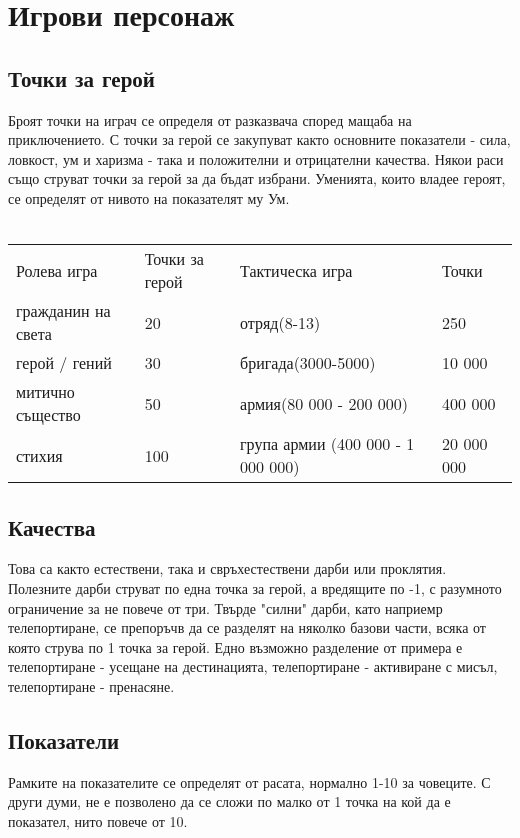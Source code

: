 
\section{Игрови персонаж}

\subsection{Точки за герой}
Броят точки на играч се определя от разказвача според мащаба на приключението.
С точки за герой се закупуват както основните показатели - сила, ловкост, ум и харизма - така и положителни и отрицателни качества.
Някои раси също струват точки за герой за да бъдат избрани.
Уменията, които владее героят, се определят от нивото на показателят му Ум.
\\
\\
\begin{tabular}{p{3cm} | p{2cm} | p{6cm} | p{3cm}}
Ролева игра          & Точки за герой      & Тактическа игра                   & Точки       \\
гражданин на света   & 20                  & отряд(8-13)                       & 250         \\
герой / гений        & 30                  & бригада(3000-5000)                & 10 000      \\
митично същество     & 50                  & армия(80 000 - 200 000)           & 400 000     \\
стихия               & 100                 & група армии (400 000 - 1 000 000) & 20 000 000  \\
\end{tabular}

\subsection{Качества}
Това са както естествени, така и свръхестествени дарби или проклятия.
Полезните дарби струват по една точка за герой, а вредящите по -1, с разумното ограничение за не повече от три.
Твърде "силни" дарби, като наприемр телепортиране, се препоръчв да се разделят на няколко базови части, всяка от която струва по 1 точка за герой.
Едно възможно разделение от примера е телепортиране - усещане на дестинацията, телепортиране - активиране с мисъл, телепортиране - пренасяне.

\subsection{Показатели}
Рамките на показателите се определят от расата, нормално 1-10 за човеците.
С други думи, не е позволено да се сложи по малко от 1 точка на кой да е показател, нито повече от 10.

